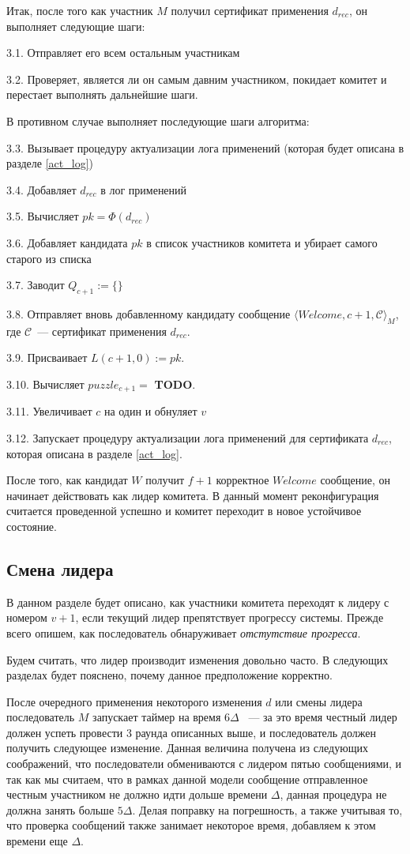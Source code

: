 Итак, после того как участник $M$ получил сертификат применения $d_{rec}$, он выполняет следующие шаги:

3.1. Отправляет его всем остальным участникам

3.2. Проверяет, является ли он самым давним участником, покидает комитет и перестает выполнять дальнейшие шаги. 

В противном случае выполняет последующие шаги алгоритма:

3.3. Вызывает процедуру актуализации лога применений (которая будет описана в разделе \ref{act_log})

3.4. Добавляет $d_{rec}$ в лог применений

3.5. Вычисляет $pk=\Phi(d_{rec})$

3.6. Добавляет кандидата $pk$ в список участников комитета и убирает самого старого из списка

3.7. Заводит $Q_{c+1} := \{\}$

3.8. Отправляет вновь добавленному кандидату сообщение $\langle Welcome, c+1, \mathcal{C} \rangle_M$, где $\mathcal{C}$~--- сертификат применения $d_{rec}$.

3.9. Присваивает $L(c+1, 0):=pk$.

3.10. Вычисляет $puzzle_{c+1}=$ \textbf{TODO}.

3.11. Увеличивает $c$ на один и обнуляет $v$

3.12. Запускает процедуру актуализации лога применений для сертификата $d_{rec}$, которая описана в разделе \ref{act_log}.

После того, как кандидат $W$ получит $f+1$ корректное $Welcome$ сообщение, он начинает действовать как лидер комитета. В данный момент реконфигурация считается проведенной успешно и комитет переходит в новое устойчивое состояние.

\subsection{Смена лидера} \label{leader-change}
В данном разделе будет описано, как участники комитета переходят к лидеру с номером $v+1$, если текущий лидер препятствует прогрессу системы. Прежде всего опишем, как последователь обнаруживает \textit{отстутствие прогресса}.

Будем считать, что лидер производит изменения довольно часто. В следующих разделах будет пояснено, почему данное предположение корректно.

После очередного применения некоторого изменения $d$ или смены лидера последователь $M$ запускает таймер на время $6\Delta$ ~--- за это время честный лидер должен успеть провести 3 раунда описанных выше, и последователь должен получить следующее изменение.
Данная величина получена из следующих соображений, что последователи обмениваются с лидером пятью сообщениями, и так как мы считаем, что в рамках данной модели сообщение отправленное честным участником не должно идти дольше времени $\Delta$, данная процедура не должна занять больше $5\Delta$. Делая поправку на погрешность, а также учитывая то, что проверка сообщений также занимает некоторое время, добавляем к этом времени еще $\Delta$.

